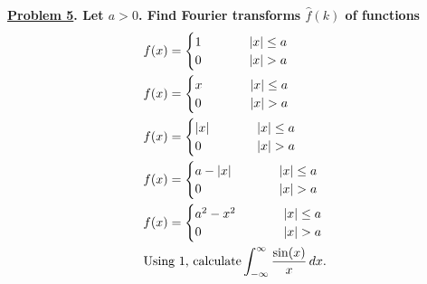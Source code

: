 \documentclass{article}
\theoremstyle{definition}
\newenvironment{boldenv}{\bfseries\boldmath}{}
\begin{document}
\begin{boldenv}
    \underline{Problem 5}. Let $a > 0$. Find Fourier transforms $\hat{f}(k)$ of functions \begin{align}
        & f(x) = \begin{cases}
            1 & \mkern 50mu |x| \leq a\\
            0 & \mkern 50mu |x| > a
        \end{cases}\\
        & f(x) = \begin{cases}
            x & \mkern 50mu |x| \leq a\\
            0 & \mkern 50mu |x| > a
        \end{cases}\\
        & f(x) = \begin{cases}
            |x| & \mkern 50mu |x| \leq a\\
            0 & \mkern 50mu |x| > a
        \end{cases}\\
        & f(x) = \begin{cases}
            a - |x| & \mkern 50mu |x| \leq a\\
            0 & \mkern 50mu |x| > a
        \end{cases}\\
        & f(x) = \begin{cases}
            a^2 - x^2 & \mkern 50mu |x| \leq a\\
            0 & \mkern 50mu |x| > a
        \end{cases}\\
        & \text{Using 1, calculate} \int_{-\infty}^\infty \frac{\sin(x)}{x}\,dx.
    \end{align}
\end{boldenv}
\end{document}
